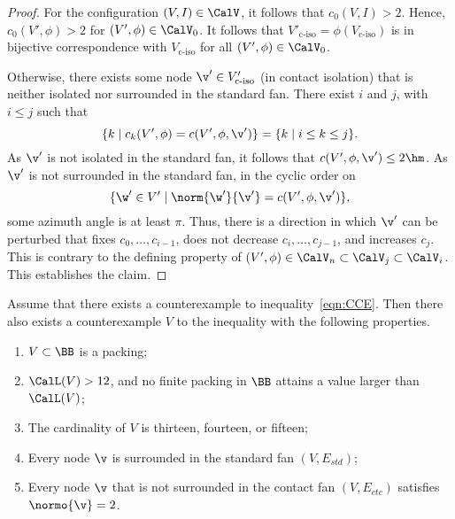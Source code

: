 \begin{proof}
For the configuration $(V,I)\in \CalV$, it follows that $c_0(V,I) >2$.
Hence, $c_0(V',\phi)>2$ for $(V',\phi)\in\CalV_0$.  It follows
that $V'_{\text{c-iso}}=\phi(V_{\text{c-iso}})$ is in bijective correspondence with
$V_{\text{c-iso}}$ for all $(V',\phi)\in \CalV_0$.

Otherwise, there exists some node $\v'\in V'_{\text{c-iso}}$ (in contact
isolation) that is neither isolated nor surrounded in the standard fan.
There exist $i$ and $j$, with $i\le j$ such that
\[ 
\{k\mid c_k(V',\phi) = c(V',\phi,\v')\} = \{k\mid i\le k\le j\}.
\] 
As $\v'$ is not isolated in the standard fan, it
follows that $c(V',\phi,\v') \le 2\hm$.  As $\v'$ is not surrounded in the
standard fan, in the cyclic order on
\[ 
\{\w'\in V' \mid \norm{\w'}{\v'} = c(V',\phi,\v')\},
\] 
some azimuth angle is at least $\pi$.
Thus, there is a direction in which $\v'$ can be perturbed
that  fixes $c_0,\ldots,c_{i-1}$, does not decrease $c_i,\ldots,c_{j-1}$, and increases $c_j$.
This is contrary to the defining property of
$(V',\phi)\in\CalV_n\subset\CalV_j\subset\CalV_i$.  This establishes the claim.
\end{proof}



\begin{lemma}[]\label{lemma:CE} 
  Assume that there exists a counterexample to
  inequality~\ref{eqn:CCE}.  Then there also exists a counterexample
  $V$ to the inequality with the following properties.
\begin{enumerate}\wasitemize 
\item $V\subset \BB$ is a packing;
\item $\CalL(V) > 12$, and no finite packing in $\BB$ attains a value
  larger than $\CalL(V)$;
\item The cardinality of $V$ is thirteen, fourteen, or fifteen;
\item Every node $\v$ is surrounded in the standard fan $(V,E_{std})$;
\item Every node $\v$ that is not surrounded in the contact fan $(V,E_{ctc})$ satisfies $\normo{\v}=2$.
\end{enumerate}\wasitemize 
\end{lemma}

